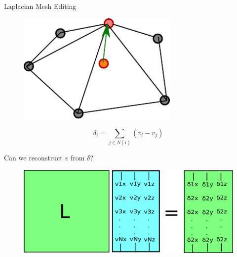 \documentclass{beamer}
\begin{document}
\begin{frame}{Laplacian Mesh Editing}

\begin{minipage}{0.45\textwidth}{
\begin{figure}[t]
    \includegraphics[width=0.7\textwidth]{2DDiscreteCurvature.pdf}
\end{figure}
}
\end{minipage}
\begin{minipage}{0.45\textwidth}
\[ \delta_i = \sum_{j \in N(i)} (v_i - v_j)\]

Can we reconstruct $v$ from $\delta$?
\end{minipage}


\begin{figure}[t]
    \includegraphics[width=\textwidth]{LaplacianReconstruction.pdf}
\end{figure}


\end{frame}
\end{document}
